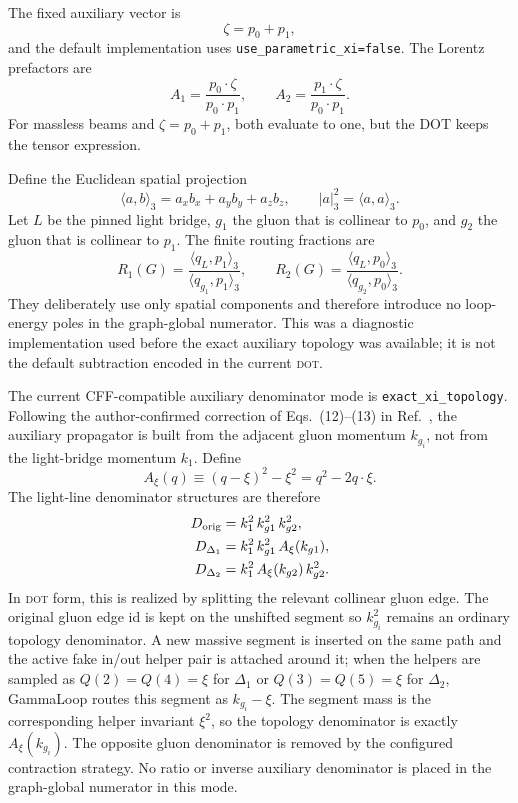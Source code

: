 \documentclass[11pt]{article}
\newcommand{\DOT}{\textsc{dot}}
\begin{document}
The fixed auxiliary vector is
\[
  \zeta=p_0+p_1,
\]
and the default implementation uses \texttt{use\_parametric\_xi=false}.  The
Lorentz prefactors are
\[
  A_1=\frac{p_0\cdot\zeta}{p_0\cdot p_1},
  \qquad
  A_2=\frac{p_1\cdot\zeta}{p_0\cdot p_1}.
\]
For massless beams and \(\zeta=p_0+p_1\), both evaluate to one, but the DOT
keeps the tensor expression.

Define the Euclidean spatial projection
\[
  \langle a,b\rangle_3=a_xb_x+a_yb_y+a_zb_z,\qquad
  |a|_3^2=\langle a,a\rangle_3.
\]
Let \(L\) be the pinned light bridge, \(g_1\) the gluon that is collinear to
\(p_0\), and \(g_2\) the gluon that is collinear to \(p_1\).  The finite
routing fractions are
\begin{equation}
  R_1(G)=\frac{\langle q_L,p_1\rangle_3}{\langle q_{g_1},p_1\rangle_3},
  \qquad
  R_2(G)=\frac{\langle q_L,p_0\rangle_3}{\langle q_{g_2},p_0\rangle_3}.
  \label{eq:routingFractions}
\end{equation}
They deliberately use only spatial components and therefore introduce no
loop-energy poles in the graph-global numerator.  This was a diagnostic
implementation used before the exact auxiliary topology was available; it is
not the default subtraction encoded in the current \DOT{}.

The current CFF-compatible auxiliary denominator mode is
\texttt{exact\_xi\_topology}.  Following the author-confirmed correction of
Eqs.~(12)--(13) in Ref.~\cite{KermanschahVicini2026}, the auxiliary
propagator is built from the adjacent gluon momentum \(k_{g_i}\), not from the
light-bridge momentum \(k_1\).  Define
\begin{equation}
  A_\xi(q)\equiv (q-\xi)^2-\xi^2=q^2-2q\cdot\xi .
  \label{eq:correctedAuxiliary}
\end{equation}
The light-line denominator structures are therefore
\begin{align}
  D_{\rm orig} &= k_1^2\,k_{g1}^2\,k_{g2}^2,\\
  D_{\Delta_1} &= k_1^2\,k_{g1}^2\,A_\xi(k_{g1}),\\
  D_{\Delta_2} &= k_1^2\,A_\xi(k_{g2})\,k_{g2}^2 .
  \label{eq:correctedDenominators}
\end{align}
In \DOT{} form, this is realized by splitting the relevant collinear gluon
edge.  The original gluon edge id is kept on the unshifted segment so
\(k_{g_i}^2\) remains an ordinary topology denominator.  A new massive segment
is inserted on the same path and the active fake in/out helper pair is attached
around it; when the helpers are sampled as \(Q(2)=Q(4)=\xi\) for \(\Delta_1\)
or \(Q(3)=Q(5)=\xi\) for \(\Delta_2\), GammaLoop routes this segment as
\(k_{g_i}-\xi\).  The segment mass is the corresponding helper invariant
\(\xi^2\), so the topology denominator is exactly \(A_\xi(k_{g_i})\).  The
opposite gluon denominator is removed by the configured contraction strategy.
No ratio or inverse auxiliary denominator is placed in the graph-global
numerator in this mode.
\end{document}
